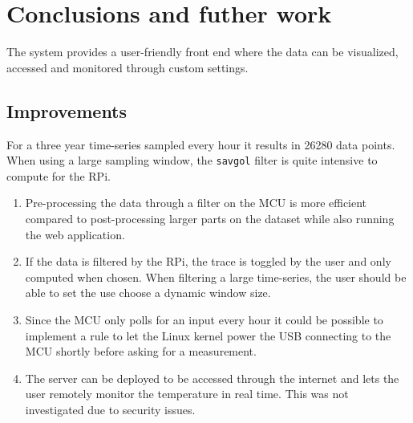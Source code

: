 \section{Conclusions and futher work}%
\label{sec:conclusions_and_futher_work}

The system provides a user-friendly front end where the data can be visualized, accessed and monitored through custom settings. 

\subsection{Improvements}%
\label{sub:improvements}
For a three year time-series sampled every hour it results in 26280 data points. When using a large sampling window, the \verb|savgol| filter is quite intensive to compute for the RPi.

\begin{enumerate}
 \item Pre-processing the data through a filter on the MCU is more efficient compared to post-processing larger parts on the dataset while also running the web application.
 \item If the data is filtered by the RPi, the trace is toggled by the user and only computed when chosen. When filtering a large time-series, the user should be able to set the use choose a dynamic window size.
 \item Since the MCU only polls for an input every hour it could be possible to implement a rule to let the Linux kernel power the USB connecting to the MCU shortly before asking for a measurement.
 \item The server can be deployed to be accessed through the internet and lets the user remotely monitor the temperature in real time. This was not investigated due to security issues.
\end{enumerate}
